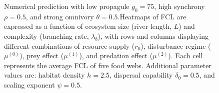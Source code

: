 \begin{figure}
\centering
{}
\caption{Numerical prediction with low propagule \(g_0 = 75\), high
synchrony \(\rho = 0.5\), and strong omnivory \(\theta = 0.5\).Heatmaps
of FCL are expressed as a function of ecosystem size (river length,
\(L\)) and complexity (branching rate, \(\lambda_b\)), with rows and
columns displaying different combinations of resource supply (\(r_0\)),
disturbance regime (\(\mu^{(0)}\)), prey effect (\(\mu^{(1)}\)), and
predation effect (\(\mu^{(2)}\)). Each cell represents the average FCL
of five food webs. Additional parameter values are: habitat density
\(h=2.5\), dispersal capability \(\delta_0=0.5\), and scaling exponent
\(\psi=0.5\).}
\end{figure}

\newpage

